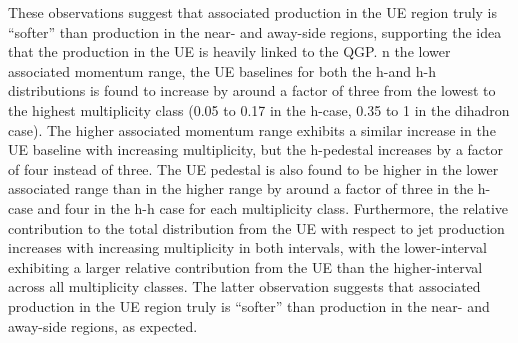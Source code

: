 These observations suggest that associated production in the UE region truly is ``softer'' than production in the near- and away-side regions, supporting the idea that the production in the UE is heavily linked to the QGP.
n the lower associated momentum range, the UE baselines for both the h-\lmb and h-h distributions is found to increase by around a factor of three from the lowest to the highest multiplicity class (0.05 to 0.17 in the h-\lmb case, 0.35 to 1 in the dihadron case). The higher associated momentum range exhibits a similar increase in the UE baseline with increasing multiplicity, but the h-\lmb pedestal increases by a factor of four instead of three. The UE pedestal is also found to be higher in the lower associated \pt range than in the higher range by around a factor of three in the h-\lmb case and four in the h-h case for each multiplicity class. Furthermore, the relative contribution to the total distribution from the UE with respect to jet production increases with increasing multiplicity in both \pt intervals, with the lower-\pt interval exhibiting a larger relative contribution from the UE than the higher-\pt interval across all multiplicity classes. The latter observation suggests that associated production in the UE region truly is ``softer'' than production in the near- and away-side regions, as expected.


